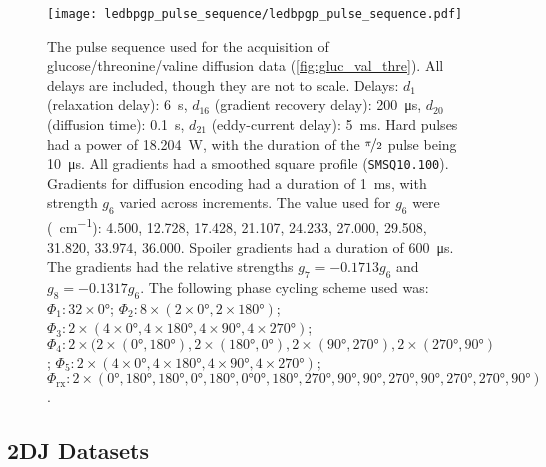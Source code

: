\begin{figure}[H]
    \texttt{[image: ledbpgp\_pulse\_sequence/ledbpgp\_pulse\_sequence.pdf]}
    \caption[
        The pulse sequence used for the acquisition of glucose/threonine/valine
        diffusion data.
    ]{
        The pulse sequence used for the acquisition of glucose/threonine/valine
        diffusion data (\cref{fig:gluc_val_thre}). All
        delays are included, though they are not to scale.
        Delays:
        $d_1$ (relaxation delay): \qty{6}{\second},
        $d_{16}$ (gradient recovery delay): \qty{200}{\micro\second},
        $d_{20}$ (diffusion time): \qty{0.1}{\second},
        $d_{21}$ (eddy-current delay): \qty{5}{\milli\second}.
        Hard pulses had a power of \qty{18.204}{\watt},
        with the duration of the $\nicefrac{\pi}{2}$ pulse being
        \qty{10}{\micro\second}.
        All gradients had a smoothed square profile
        (\texttt{SMSQ10.100}).
        Gradients for diffusion encoding had a duration of
        \qty{1}{\milli\second}, with strength $g_6$ varied across increments.
        The value used for $g_6$ were (\unit{\gauss \per \centi \meter}):
        4.500,
        12.728,
        17.428,
        21.107,
        24.233,
        27.000,
        29.508,
        31.820,
        33.974,
        36.000.
        Spoiler gradients had a duration of \qty{600}{\micro\second}. The
        gradients had the relative strengths $g_7=-0.1713g_6$ and
        $g_8=-0.1317g_6$.
        The following phase cycling scheme used was:
        $\Phi_1: 32 \times \ang{0}$;
        $\Phi_2: 8 \times (2 \times \ang{0}, 2 \times \ang{180})$;
        $\Phi_3: 2 \times (4 \times \ang{0}, 4 \times \ang{180}, 4 \times \ang{90}, 4 \times \ang{270})$;
        $\Phi_4: 2 \times (2 \times (\ang{0}, \ang{180}), 2 \times (\ang{180}, \ang{0}), 2 \times (\ang{90}, \ang{270}), 2 \times (\ang{270}, \ang{90})$;
        $\Phi_5: 2 \times (4 \times \ang{0}, 4 \times \ang{180}, 4 \times \ang{90}, 4 \times \ang{270})$;
        $\Phi_{\text{rx}}: 2 \times (\ang{0}, \ang{180}, \ang{180}, \ang{0}, \ang{180}, \ang{0} \ang{0}, \ang{180},
        \ang{270}, \ang{90}, \ang{90}, \ang{270}, \ang{90}, \ang{270}, \ang{270}, \ang{90})$.
    }
    \label{fig:ledbpgp2s}
\end{figure}

\subsection{\acs{2DJ} Datasets}
\label{subsec:cupid-experimental}

